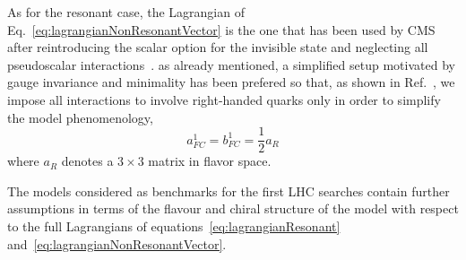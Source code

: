 
As for the resonant case, the Lagrangian of Eq.~\eqref{eq:lagrangianNonResonantVector} is the one that
has been used by CMS after reintroducing the scalar option for the invisible
state and neglecting all pseudoscalar interactions~\cite{CMSmonotop}. as
already mentioned, a simplified setup motivated by gauge invariance and
minimality has been prefered so that, as shown in Ref.~\cite{Boucheneb:2014wza}, we
impose all interactions to involve right-handed quarks only in order to simplify the model phenomenology,
\begin{equation}
a^1_{FC} = b^1_{FC} = \frac12 a_R
\end{equation}
where $a_R$ denotes a $3\times 3$ matrix in flavor space.

 
The models considered as benchmarks for the first LHC searches
contain further assumptions in terms of the flavour and chiral structure of the model
with respect to the full Lagrangians of equations~\eqref{eq:lagrangianResonant} and~\eqref{eq:lagrangianNonResonantVector}.


